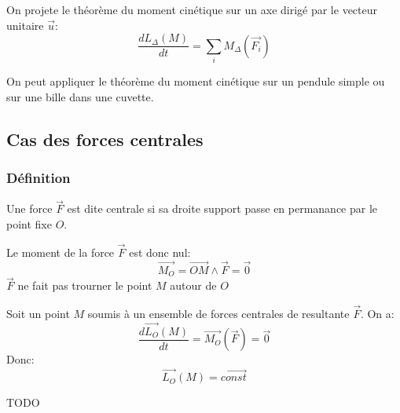 \begin{theo}
    On projete le théorème du moment cinétique sur un axe dirigé
    par le vecteur unitaire $\vec{u}$:
    \[\frac{dL_{\Delta}(M)}{dt} = \sum_{i} M_{\Delta}(\vec{F_{i}})\]
\end{theo}

\begin{ex}
    On peut appliquer le théorème du moment cinétique sur un pendule simple ou 
    sur une bille dans une cuvette.
\end{ex}


\subsection{Cas des forces centrales}
\subsubsection{Définition}

\begin{defi}
    Une force $\vec{F}$ est dite centrale si sa droite support passe 
    en permanance par le point fixe $O$.
\end{defi}

\begin{cons}
    Le moment de la force $\vec{F}$ est donc nul:
    \[\vec{M_{O}} = \vec{OM} \wedge \vec{F} = \vec{0}\]
    $\vec{F}$ ne fait pas trourner le point $M$ autour de $O$
\end{cons}

\begin{cons}
    Soit un point $M$ soumis à un ensemble de forces centrales de resultante $\vec{F}$.
    On a:
    \[\frac{d\vec{L_{O}}(M)}{dt} = \vec{M_{O}}(\vec{F}) = \vec{0}\]
    Donc:
    \[\vec{L_{O}}(M) = \vec{const}\]

    TODO
\end{cons}


